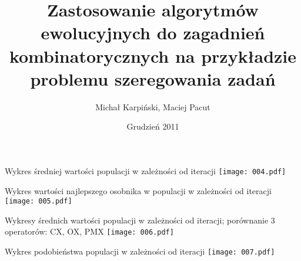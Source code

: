 \documentclass{beamer}
\title{Zastosowanie algorytmów ewolucyjnych do zagadnień kombinatorycznych na przykładzie problemu szeregowania zadań}
\author{Michał Karpiński, Maciej Pacut}
\date{Grudzień 2011}
\begin{document}
\maketitle
 
\begin{frame}{Wykres średniej wartości populacji w zależności od iteracji}
  \texttt{[image: 004.pdf]}
\end{frame}

\begin{frame}{Wykres wartości najlepszego osobnika w populacji w
    zależności od iteracji}
  \texttt{[image: 005.pdf]}
\end{frame}

\begin{frame}{Wykresy średnich wartości populacji w zależności od
    iteracji; porównanie 3 operatorów: CX, OX, PMX}
  \texttt{[image: 006.pdf]}
\end{frame}

\begin{frame}{Wykres podobieństwa populacji w zależności od iteracji}
  \texttt{[image: 007.pdf]}
\end{frame}
\end{document}
